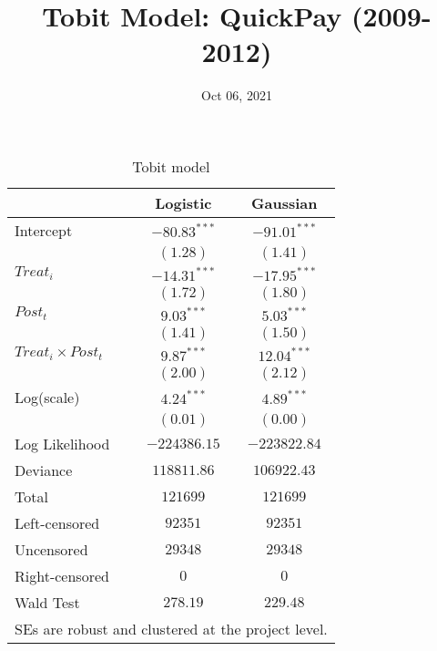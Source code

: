 \documentclass[
]{article}
\title{Tobit Model: QuickPay (2009-2012)}
\author{}
\date{\vspace{-2.5em}Oct 06, 2021}
\begin{document}
\maketitle

\begin{table}
\begin{center}
\begin{tabular}{l c c}
\hline
 & Logistic & Gaussian \\
\hline
Intercept               & $-80.83^{***}$ & $-91.01^{***}$ \\
                        & $(1.28)$       & $(1.41)$       \\
$Treat_i$               & $-14.31^{***}$ & $-17.95^{***}$ \\
                        & $(1.72)$       & $(1.80)$       \\
$Post_t$                & $9.03^{***}$   & $5.03^{***}$   \\
                        & $(1.41)$       & $(1.50)$       \\
$Treat_i \times Post_t$ & $9.87^{***}$   & $12.04^{***}$  \\
                        & $(2.00)$       & $(2.12)$       \\
Log(scale)              & $4.24^{***}$   & $4.89^{***}$   \\
                        & $(0.01)$       & $(0.00)$       \\
\hline
Log Likelihood          & $-224386.15$   & $-223822.84$   \\
Deviance                & $118811.86$    & $106922.43$    \\
Total                   & $121699$       & $121699$       \\
Left-censored           & $92351$        & $92351$        \\
Uncensored              & $29348$        & $29348$        \\
Right-censored          & $0$            & $0$            \\
Wald Test               & $278.19$       & $229.48$       \\
\hline
\multicolumn{3}{l}{\scriptsize{SEs are robust and clustered at the project level.}}
\end{tabular}
\caption{Tobit model}
\label{table:coefficients}
\end{center}
\end{table}
\end{document}

